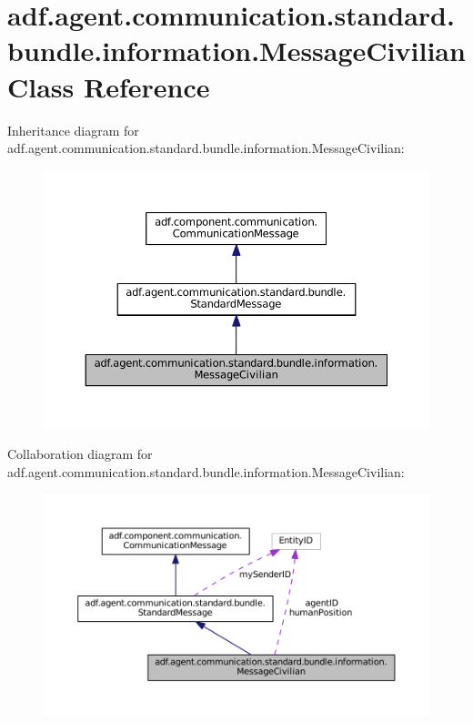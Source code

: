\hypertarget{classadf_1_1agent_1_1communication_1_1standard_1_1bundle_1_1information_1_1MessageCivilian}{}\section{adf.\+agent.\+communication.\+standard.\+bundle.\+information.\+Message\+Civilian Class Reference}
\label{classadf_1_1agent_1_1communication_1_1standard_1_1bundle_1_1information_1_1MessageCivilian}


Inheritance diagram for adf.\+agent.\+communication.\+standard.\+bundle.\+information.\+Message\+Civilian\+:
\nopagebreak
\begin{figure}[H]
\begin{center}
\leavevmode
\includegraphics[width=350pt]{classadf_1_1agent_1_1communication_1_1standard_1_1bundle_1_1information_1_1MessageCivilian__inherit__graph}
\end{center}
\end{figure}


Collaboration diagram for adf.\+agent.\+communication.\+standard.\+bundle.\+information.\+Message\+Civilian\+:
\nopagebreak
\begin{figure}[H]
\begin{center}
\leavevmode
\includegraphics[width=350pt]{classadf_1_1agent_1_1communication_1_1standard_1_1bundle_1_1information_1_1MessageCivilian__coll__graph}
\end{center}
\end{figure}
